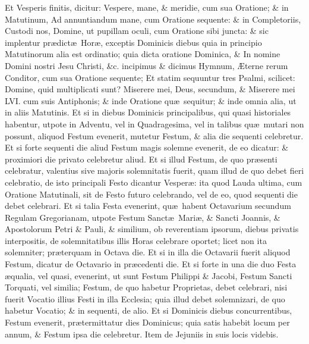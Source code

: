 \documentclass[letter,11pt]{book}
\begin{document}
\begin{multicols}{2}
Et Vesperis finitis, dicitur: \color{black} Vespere, mane, \& meridie, \color{Red} cum sua Oratione; \& in Matutinum, \color{black} Ad annuntiandum mane, \color{Red} cum Oratione sequente: \& in Completoriis, \color{black} Custodi nos, Domine, ut pupillam oculi, \color{Red} cum Oratione sibi juncta: \& sic implentur pr\ae dict\ae \ Hor\ae , exceptis Dominicis diebus quia in principio Matutinorum alia est ordinatio; quia dicta oratione Dominica, \& \color{black} In nomine Domini nostri Jesu Christi, \&c. \color{Red} incipimus \& dicimus Hymnum, \color{black} \AE terne rerum Conditor, \color{Red} cum sua Oratione sequente; Et statim sequuntur tres Psalmi, scilicet: \color{black} Domine, quid multiplicati sunt? Miserere mei, Deus, secundum, \color{Red} \& \color{black} Miserere mei LVI. \color{Red} cum suis Antiphonis; \& inde Oratione qu\ae \ sequitur; \& inde omnia alia, ut in aliis Matutinis.
Et si in diebus Dominicis principalibus, qui quasi historiales habentur, utpote in Adventu, vel in Quadragesima, vel in talibus qu\ae \ mutari non possunt, aliquod Festum evenerit, mutetur Festum, \& alia die sequenti celebretur.
Et si forte sequenti die aliud Festum magis solemne evenerit, de eo dicatur: \& proximiori die privato celebretur aliud.
Et si illud Festum, de quo pr\ae senti celebratur, valentius sive majoris solemnitatis fuerit, quam illud de quo debet fieri celebratio, de isto principali Festo dicantur Vesper\ae : ita quod Lauda ultima, cum Oratione Matutinali, sit de Festo futuro celebrando, vel de eo, quod sequenti die debet celebrari.
Et si talia Festa evenerint, qu\ae \ habent Octavarium secundum Regulam Gregorianam, utpote Festum Sanct\ae \ Mari\ae , \& Sancti Joannis, \& Apostolorum Petri \& Pauli, \& similium, ob reverentiam ipsorum, diebus privatis interpositis, de solemnitatibus illis Horas celebrare oportet; licet non ita solemniter; pr\ae terquam in Octava die.
Et si in illa die Octavarii fuerit aliquod Festum, dicatur de Octavario in pr\ae cedenti die.
Et si forte in una die duo Festa \ae qualia, vel quasi, evenerint, ut sunt Festum Philippi \& Jacobi, Festum Sancti Torquati, vel similia; Festum, de quo habetur Proprietas, debet celebrari, nisi fuerit Vocatio illius Festi in illa Ecclesia; quia illud debet solemnizari, de quo habetur Vocatio; \& in sequenti, de alio.
Et si Dominicis diebus concurrentibus, Festum evenerit, pr\ae termittatur dies Dominicus; quia satis habebit locum per annum, \& Festum ipsa die celebretur.
Item de Jejuniis in suis locis videbis. \color{black}
\end{multicols}
\fancyhead{}
\end{document}
